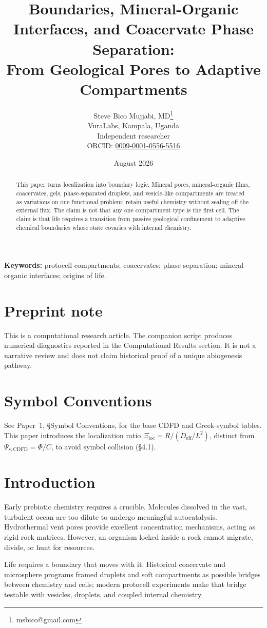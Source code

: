 \documentclass[11pt,a4paper]{article}
\title{Boundaries, Mineral-Organic Interfaces, and Coacervate Phase Separation:\\ From Geological Pores to Adaptive Compartments}
\author{Steve Bico Mujjabi, MD\thanks{msbico@gmail.com}\\
VuraLabs, Kampala, Uganda\\
Independent researcher\\
ORCID: \href{https://orcid.org/0009-0001-0556-5516}{0009-0001-0556-5516}}
\date{August 2026}
\begin{document}
\maketitle

\begin{abstract}
This paper turns localization into boundary logic. Mineral pores, mineral-organic films, coacervates, gels, phase-separated droplets, and vesicle-like compartments are treated as variations on one functional problem: retain useful chemistry without sealing off the external flux. The claim is not that any one compartment type is the first cell. The claim is that life requires a transition from passive geological confinement to adaptive chemical boundaries whose state covaries with internal chemistry.
\end{abstract}

\noindent\textbf{Keywords:} protocell compartments; coacervates; phase separation; mineral-organic interfaces; origins of life.

\section*{Preprint note}
This is a computational research article. The companion script produces numerical diagnostics reported in the Computational Results section. It is not a narrative review and does not claim historical proof of a unique abiogenesis pathway.

\section*{Symbol Conventions}

\noindent See Paper~1, \S Symbol Conventions, for the base CDFD and Greek-symbol tables. This paper introduces the localization ratio $\Xi_{\mathrm{loc}}=R/(D_{\mathrm{eff}}/L^2)$, distinct from $\Psi_{s,\mathrm{CDFD}}=\Phi/C$, to avoid symbol collision (\S4.1).

\section{Introduction}
Early prebiotic chemistry requires a crucible. Molecules dissolved in the vast, turbulent ocean are too dilute to undergo meaningful autocatalysis. Hydrothermal vent pores provide excellent concentration mechanisms, acting as rigid rock matrices. However, an organism locked inside a rock cannot migrate, divide, or hunt for resources.

Life requires a boundary that moves with it. Historical coacervate and microsphere programs framed droplets and soft compartments as possible bridges between chemistry and cells; modern protocell experiments make that bridge testable with vesicles, droplets, and coupled internal chemistry.
\end{document}
